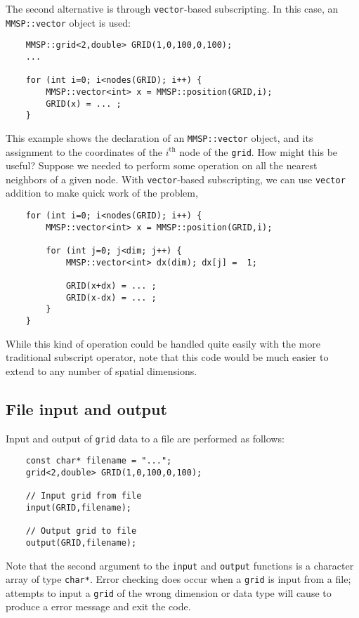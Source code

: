 The second alternative is through {\tt vector}-based subscripting.  In this case, an {\tt MMSP::vector} object is used:
\begin{shadebox}
\begin{verbatim}
    MMSP::grid<2,double> GRID(1,0,100,0,100);
    ...

    for (int i=0; i<nodes(GRID); i++) {
        MMSP::vector<int> x = MMSP::position(GRID,i);
        GRID(x) = ... ;
    }
\end{verbatim}
\end{shadebox}
This example shows the declaration of an {\tt MMSP::vector} object, and its assignment to the coordinates of the $i^\text{th}$ node of the {\tt grid}.  How might this be useful?  Suppose we needed to perform some operation on all the nearest neighbors of a given node.  With {\tt vector}-based subscripting, we can use {\tt vector} addition to make quick work of the problem,
\begin{shadebox}
\begin{verbatim}
    for (int i=0; i<nodes(GRID); i++) {
        MMSP::vector<int> x = MMSP::position(GRID,i);

        for (int j=0; j<dim; j++) {
            MMSP::vector<int> dx(dim); dx[j] =  1;

            GRID(x+dx) = ... ;
            GRID(x-dx) = ... ;
        }
    }
\end{verbatim}
\end{shadebox}
While this kind of operation could be handled quite easily with the more traditional subscript operator, note that this code would be much easier to extend to any number of spatial dimensions.

\subsection{File input and output}
Input and output of {\tt grid} data to a file are performed as follows:
\begin{shadebox}
\begin{verbatim}
    const char* filename = "...";
    grid<2,double> GRID(1,0,100,0,100);

    // Input grid from file
    input(GRID,filename);

    // Output grid to file
    output(GRID,filename);
\end{verbatim}
\end{shadebox}
Note that the second argument to the {\tt input} and {\tt output} functions is a character array of type {\tt char*}.  Error checking does occur when a {\tt grid} is input from a file; attempts to input a {\tt grid} of the wrong dimension or data type will cause \MMSP to produce a error message and exit the code.

